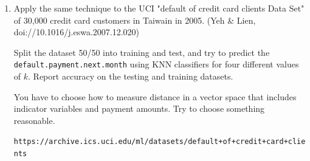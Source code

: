 \documentclass[12pt]{book}
\theoremstyle{definition}
\begin{document}
\begin{enumerate}
\item
Apply the same technique to the UCI "default of credit card clients Data Set" of 30,000 credit card customers in Taiwain in 2005. (Yeh \& Lien,  doi://10.1016/j.eswa.2007.12.020)   

Split the dataset 50/50 into training and test, and try to predict the \texttt{default.payment.next.month} using KNN classifiers for four different values of $k$.
Report accuracy on the testing and training datasets.

You have to choose how to measure distance in a vector space that includes indicator variables and payment amounts.  Try to choose something reasonable.

\texttt{https://archive.ics.uci.edu/ml/datasets/default+of+credit+card+clients}

\end{enumerate}
\end{document}
